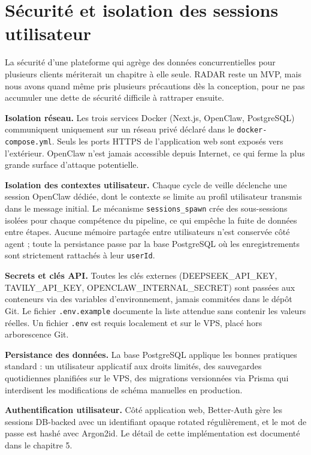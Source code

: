 \documentclass[12pt,a4paper,openany]{report}
\begin{document}
\section{Sécurité et isolation des sessions utilisateur}
\label{sec:securite}

La sécurité d'une plateforme qui agrège des données concurrentielles pour plusieurs clients mériterait un chapitre à elle seule. RADAR reste un MVP, mais nous avons quand même pris plusieurs précautions dès la conception, pour ne pas accumuler une dette de sécurité difficile à rattraper ensuite.

\textbf{Isolation réseau.} Les trois services Docker (Next.js, OpenClaw, PostgreSQL) communiquent uniquement sur un réseau privé déclaré dans le \texttt{docker-compose.yml}. Seuls les ports HTTPS de l'application web sont exposés vers l'extérieur. OpenClaw n'est jamais accessible depuis Internet, ce qui ferme la plus grande surface d'attaque potentielle.

\textbf{Isolation des contextes utilisateur.} Chaque cycle de veille déclenche une session OpenClaw dédiée, dont le contexte se limite au profil utilisateur transmis dans le message initial. Le mécanisme \texttt{sessions\_spawn} crée des sous-sessions isolées pour chaque compétence du pipeline, ce qui empêche la fuite de données entre étapes. Aucune mémoire partagée entre utilisateurs n'est conservée côté agent ; toute la persistance passe par la base PostgreSQL où les enregistrements sont strictement rattachés à leur \texttt{userId}.

\textbf{Secrets et clés API.} Toutes les clés externes (DEEPSEEK\_API\_KEY, TAVILY\_API\_KEY, OPENCLAW\_INTERNAL\_SECRET) sont passées aux conteneurs via des variables d'environnement, jamais commitées dans le dépôt Git. Le fichier \texttt{.env.example} documente la liste attendue sans contenir les valeurs réelles. Un fichier \texttt{.env} est requis localement et sur le VPS, placé hors arborescence Git.

\textbf{Persistance des données.} La base PostgreSQL applique les bonnes pratiques standard : un utilisateur applicatif aux droits limités, des sauvegardes quotidiennes planifiées sur le VPS, des migrations versionnées via Prisma qui interdisent les modifications de schéma manuelles en production.

\textbf{Authentification utilisateur.} Côté application web, Better-Auth gère les sessions DB-backed avec un identifiant opaque rotated régulièrement, et le mot de passe est hashé avec Argon2id. Le détail de cette implémentation est documenté dans le chapitre 5.
\end{document}
